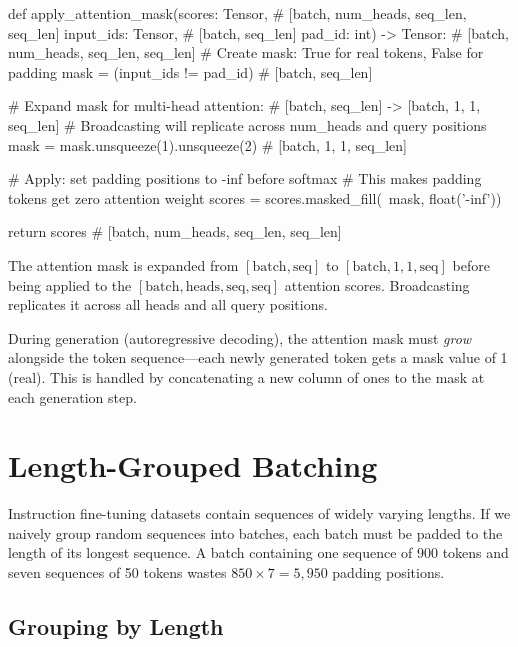 \begin{pseudocode}
def apply_attention_mask(scores: Tensor,       # [batch, num_heads, seq_len, seq_len]
                          input_ids: Tensor,    # [batch, seq_len]
                          pad_id: int) -> Tensor:  # [batch, num_heads, seq_len, seq_len]
    # Create mask: True for real tokens, False for padding
    mask = (input_ids != pad_id)              # [batch, seq_len]

    # Expand mask for multi-head attention:
    # [batch, seq_len] -> [batch, 1, 1, seq_len]
    # Broadcasting will replicate across num_heads and query positions
    mask = mask.unsqueeze(1).unsqueeze(2)      # [batch, 1, 1, seq_len]

    # Apply: set padding positions to -inf before softmax
    # This makes padding tokens get zero attention weight
    scores = scores.masked_fill(~mask, float('-inf'))

    return scores  # [batch, num_heads, seq_len, seq_len]
\end{pseudocode}

\begin{keyconcept}
  The attention mask is expanded from $[\text{batch}, \text{seq}]$ to
  $[\text{batch}, 1, 1, \text{seq}]$ before being applied to the
  $[\text{batch}, \text{heads}, \text{seq}, \text{seq}]$ attention
  scores. Broadcasting replicates it across all heads and all query
  positions.

  During generation (autoregressive decoding), the attention mask must
  \emph{grow} alongside the token sequence---each newly generated token
  gets a mask value of 1 (real). This is handled by concatenating a new
  column of ones to the mask at each generation step.
\end{keyconcept}

\section{Length-Grouped Batching}

Instruction fine-tuning datasets contain sequences of widely varying
lengths. If we naively group random sequences into batches, each batch
must be padded to the length of its longest sequence. A batch containing
one sequence of 900 tokens and seven sequences of 50 tokens wastes
$850 \times 7 = 5{,}950$ padding positions.

\subsection{Grouping by Length}

